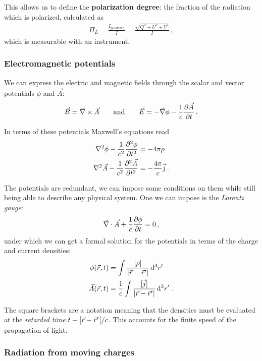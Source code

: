 \documentclass[main.tex]{subfiles}
\begin{document}
This allows us to define the \textbf{polarization degree}: the fraction of the radiation which is polarized, calculated as 
%
\begin{align}
\Pi_{L} = \frac{I _{\text{polarized}}}{I} = \frac{\sqrt{Q^2+U^2+V^2}}{I}
\,,
\end{align}
%
which is measurable with an instrument.

\subsubsection{Electromagnetic potentials}

We can express the electric and magnetic fields through the scalar and vector potentials \(\phi \) and \(\vec{A}\): 
%
\begin{align}
\vec{B} = \vec{\nabla} \times \vec{A} 
\qquad \text{and} \qquad
\vec{E} = - \vec{\nabla} \phi - \frac{1}{c} \pdv{\vec{A}}{t}
\,.
\end{align}

In terms of these potentials Maxwell's equations read 
%
\begin{align}
\nabla^2 \phi - \frac{1}{c^2} \pdv[2]{\phi }{t} &= - 4 \pi \rho \\
\nabla^2 \vec{A} - \frac{1}{c^2} \pdv[2]{\vec{A}}{t} &= - \frac{4 \pi }{c} \vec{j} 
\,.
\end{align}

The potentials are redundant, we can impose some conditions on them while still being able to describe any physical system. One we can impose is the \emph{Lorentz gauge}: 
%
\begin{align}
\vec{\nabla} \cdot \vec{A} + \frac{1}{c} \pdv{\phi }{t} = 0
\,,
\end{align}
%
under which we can get a formal solution for the potentials in terms of the charge and current densities: 
%
\begin{align}
\phi (\vec{r}, t) &= \int \frac{[ \rho ]}{\abs{\vec{r} - \vec{r}'}} \dd[3]{r'} \\
\vec{A} (\vec{r}, t) &= \frac{1}{c} \int \frac{[ \vec{j} ]}{\abs{\vec{r} - \vec{r}'}} \dd[3]{r'}
\,.
\end{align}

The square brackets are a notation meaning that the densities must be evaluated at the \emph{retarded time} \(t - \abs{\vec{r} - \vec{r}'} / c\). 
This accounts for the finite speed of the propagation of light. 

\subsubsection{Radiation from moving charges}
\end{document}

